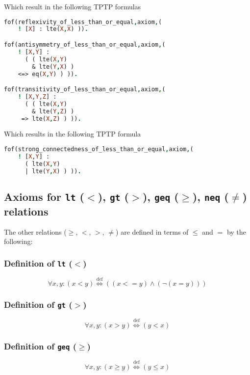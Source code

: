 \documentclass[magisterska,en]{pracamgr}
\newcommand{\code}[1]{\texttt{#1}}
\begin{document}
Which result in the following TPTP formulas
\begin{lstlisting}[language=Prolog, caption=TPTP axioms for \code{lte} ($\leq))$]
fof(reflexivity_of_less_than_or_equal,axiom,(
    ! [X] : lte(X,X) )). 

fof(antisymmetry_of_less_than_or_equal,axiom,(
    ! [X,Y] :
      ( ( lte(X,Y)
        & lte(Y,X) )
    <=> eq(X,Y) ) )). 

fof(transitivity_of_less_than_or_equal,axiom,(
    ! [X,Y,Z] :
      ( ( lte(X,Y)
        & lte(Y,Z) )
     => lte(X,Z) ) )).
\end{lstlisting}

\begin{comment}
Additionally, to make the space of all variables a totally ordered set, strong connectedness of the \code{lte} relation is required.

$$
\forall x, y : (x \leq y) \lor (y \leq x)
$$
\end{comment}

Which results in the following TPTP formula
\begin{lstlisting}[language=Prolog, caption=TPTP axiom for the strong connectedness of \code{lte} ($\leq$)]
fof(strong_connectedness_of_less_than_or_equal,axiom,(
    ! [X,Y] :
      ( lte(X,Y)
      | lte(Y,X) ) )).
\end{lstlisting}



\subsection{Axioms for \code{lt} ($<$), \code{gt} ($>$), \code{geq} ($\geq$), \code{neq} ($\neq$) relations}
The other relations ($\geq$, $<$, $>$, $\neq$) are defined in terms of $\leq$ and $=$ by the following:
\subsubsection{Definition of \code{lt} ($<$)}
$$
\forall x, y : (x<y) \mathrel{\overset{\text{def}}{\iff}} (( x<=y) \land (\neg (x=y)))
$$
\subsubsection{Definition of \code{gt} ($>$)}
$$
\forall x, y : (x>y) \mathrel{\overset{\text{def}}{\iff}} (y<x)
$$

\subsubsection{Definition of \code{geq} ($\geq$)}
$$
\forall x, y : (x \geq y) \mathrel{\overset{\text{def}}{\iff}} (y \leq x)
$$
\end{document}
